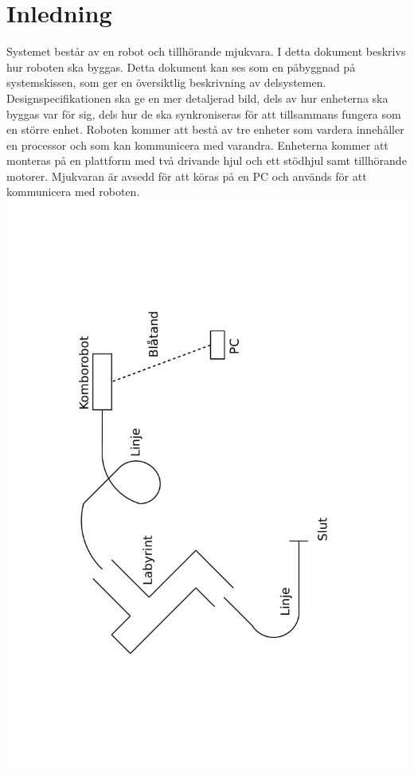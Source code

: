 \section{Inledning}
Systemet består av en robot och tillhörande mjukvara. I detta dokument beskrivs hur roboten ska byggas. Detta dokument kan ses som en påbyggnad på systemskissen, som ger en översiktlig beskrivning av delsystemen. Designspecifikationen ska ge en mer detaljerad bild, dels av hur enheterna ska byggas var för sig, dels hur de ska synkroniseras för att tillsammans fungera som en större enhet.
Roboten kommer att bestå av tre enheter som vardera innehåller en processor och som kan kommunicera med varandra. 
Enheterna kommer att monteras på en plattform med två drivande hjul och ett stödhjul samt tillhörande motorer.
Mjukvaran är avsedd för att köras på en PC och används för att kommunicera med roboten. 
\includegraphics[angle=270,scale=0.5]{bilder/Oversikt.pdf}